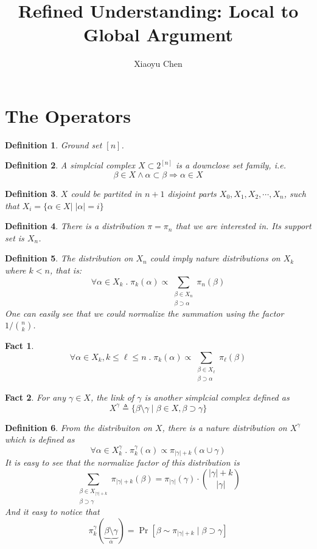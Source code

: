 \documentclass{article}
\title{Refined Understanding: Local to Global Argument}
\author{Xiaoyu Chen}
\date{}
\newtheorem{define}{Definition}[section]
\newtheorem{fact}{Fact}[section]
\begin{document}
\maketitle
\section{The Operators}

\begin{define}
  Ground set $[n]$.
\end{define}

\begin{define}
  A simplcial complex $X \subset 2^{[n]}$ is a downclose set family, i.e.
  \[\beta \in X \land \alpha \subset \beta \Rightarrow \alpha\in X\]
\end{define}

\begin{define}
  $X$ could be partited in $n+1$ disjoint parts $X_0, X_1, X_2, \cdots, X_n$, such that
  $X_i = \{\alpha\in X |\; |\alpha| = i\}$
\end{define}

\begin{define}
  There is a distribution $\pi = \pi_n$ that we are interested in.
  Its support set is $X_n$.
\end{define}

\begin{define}
  The distribution on $X_n$ could imply nature distributions on $X_k$ where $k < n$, that is:
  \[\forall \alpha\in X_k \;.\; \pi_k(\alpha) \propto \sum_{\substack{\beta\in X_n \\ \beta\supset \alpha}} \pi_n(\beta)\]
  One can easily see that we could normalize the summation using the factor $1/\binom{n}{k}$.
\end{define}

\begin{fact}
  \[\forall \alpha\in X_k, k \leq \ell\leq n \;.\; \pi_k(\alpha) \propto \sum_{\substack{\beta\in X_\ell\\ \beta\supset \alpha}} \pi_\ell(\beta)\]
\end{fact}

\begin{fact}
  For any $\gamma \in X$, the link of $\gamma$ is another simplcial complex defined as
  \[X^\gamma \triangleq \{\beta\setminus \gamma \;|\; \beta\in X, \beta\supset \gamma\}\]
\end{fact}

\begin{define}
  From the distribuiton on $X$, there is a nature distribution on $X^\gamma$ which is defined as
  \[\forall \alpha \in X^\gamma_k \;.\; \pi^\gamma_k(\alpha) \propto \pi_{|\gamma|+k}(\alpha \cup \gamma)\]
  It is easy to see that the normalize factor of this distribution is
  \[\sum_{\substack{\beta\in X_{|\gamma| + k} \\ \beta \supset \gamma}} \pi_{|\gamma|+k}(\beta) = \pi_{|\gamma|}(\gamma) \cdot \binom{|\gamma| + k}{|\gamma|}\]
  And it easy to notice that
  \[\pi^\gamma_k(\underbrace{\beta\setminus\gamma}_{\alpha}) = \Pr[\beta\sim \pi_{|\gamma| + k} \;|\; \beta \supset \gamma]\]
\end{define}
\end{document}
